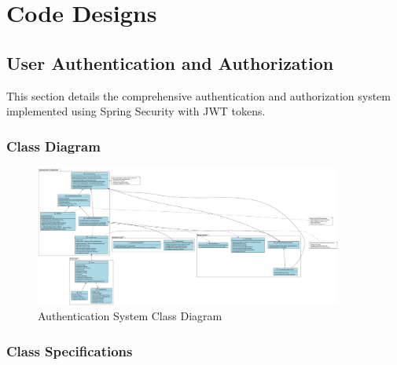 \documentclass[12pt,a4paper]{article}
\begin{document}
\section{Code Designs}

\subsection{User Authentication and Authorization}

This section details the comprehensive authentication and authorization system implemented using Spring Security with JWT tokens.

\subsubsection{Class Diagram}

\begin{figure}[H]
\centering
\includegraphics[width=0.9\textwidth]{diagrams/authentication_class_diagram.svg}
\caption{Authentication System Class Diagram}
\label{fig:auth-class-diagram}
\end{figure}

\subsubsection{Class Specifications}
\end{document}
